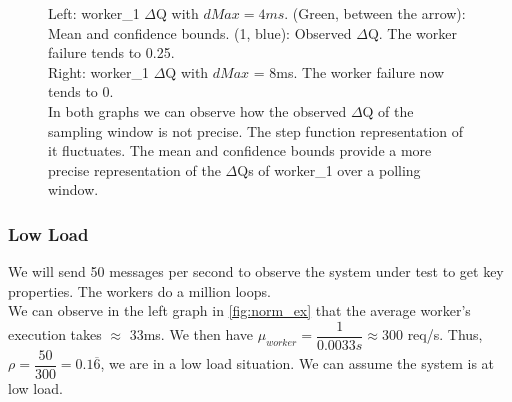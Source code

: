 \begin{figure}[H]
\begin{subfigure}{.5\textwidth}
                \label{fig:w18}
            \end{subfigure}
            \caption{Left: worker\_1 $\Delta$Q with $dMax = 4ms$. (Green, between the arrow): Mean and confidence bounds. (1, blue): Observed $\Delta$Q. The worker failure tends to 0.25. \\
            Right: worker\_1 $\Delta$Q with $dMax$ = 8ms. The worker failure now tends to 0. \\
            In both graphs we can observe how the observed $\Delta$Q of the sampling window is not precise. The step function representation of it fluctuates. The mean and confidence bounds provide a more precise representation of the $\Delta$Qs of worker\_1 over a polling window.}%
            \label{fig:w1w2hb}
            \end{figure}

    \subsubsection{Low Load} 
   We will send 50 messages per second to observe the system under test to get key properties. The workers do a million loops. \\
    We can observe in the left graph in \cref{fig:norm_ex} that the average worker's execution takes $\approx$ 33ms. We then have $\mu_{worker} = \dfrac{1}{0.0033 s} \approx 300$ req/s. Thus, $\rho = \dfrac{50}{300} = 0.1\overline{6}$, we are in a low load situation. We can assume the system is at low load.

